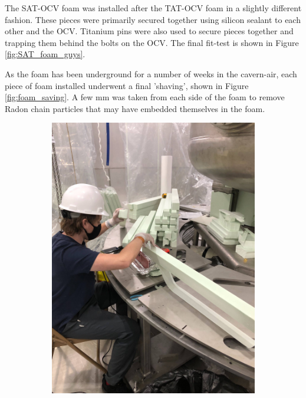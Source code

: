 \par
The SAT-OCV foam was installed after the TAT-OCV foam in a slightly different fashion.
These pieces were primarily secured together using silicon sealant to each other and the OCV.
Titanium pins were also used to secure pieces together and trapping them behind the bolts on the OCV.
The final fit-test is shown in Figure \ref{fig:SAT_foam_guys}.

\par
As the foam has been underground for a number of weeks in the cavern-air, each piece of foam installed underwent a final 'shaving', shown in Figure \ref{fig:foam_saving}.
A few mm was taken from each side of the foam to remove Radon chain particles that may have embedded themselves in the foam.

\begin{figure}[!htbp]
  \begin{subfigure}{.5\textwidth}
  \centering
  \includegraphics[width=\linewidth]{Figures/Construction/foam_shaving.jpg}

\end{subfigure}
\end{figure}

